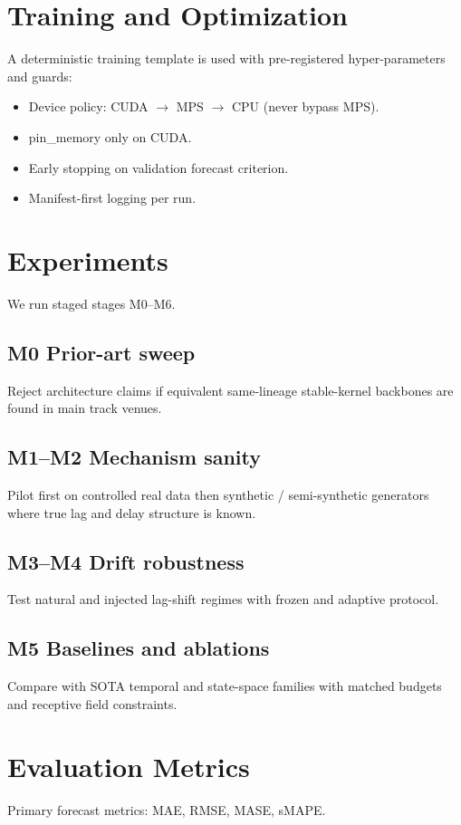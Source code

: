 \documentclass[11pt]{article}
\begin{document}
\section{Training and Optimization}
A deterministic training template is used with pre-registered hyper-parameters and guards:
\begin{itemize}
\item Device policy: CUDA $\rightarrow$ MPS $\rightarrow$ CPU (never bypass MPS).
\item pin\_memory only on CUDA.
\item Early stopping on validation forecast criterion.
\item Manifest-first logging per run.
\end{itemize}

\section{Experiments}
We run staged stages M0--M6.

\subsection{M0 Prior-art sweep}
Reject architecture claims if equivalent same-lineage stable-kernel backbones are found in main track venues.

\subsection{M1--M2 Mechanism sanity}
Pilot first on controlled real data then synthetic / semi-synthetic generators where true lag and delay structure is known.

\subsection{M3--M4 Drift robustness}
Test natural and injected lag-shift regimes with frozen and adaptive protocol.

\subsection{M5 Baselines and ablations}
Compare with SOTA temporal and state-space families with matched budgets and receptive field constraints.

\section{Evaluation Metrics}
Primary forecast metrics: MAE, RMSE, MASE, sMAPE.
\end{document}
